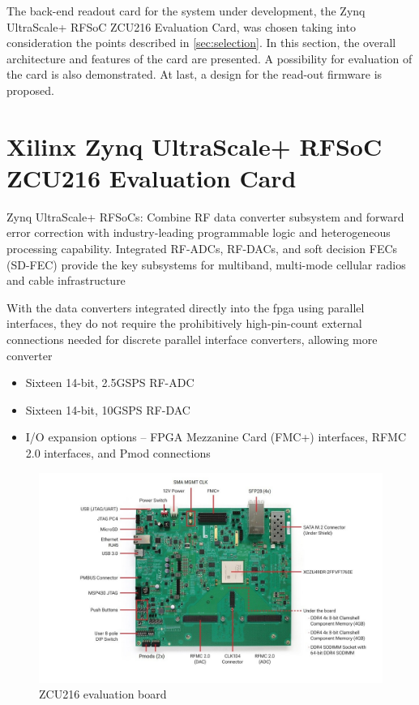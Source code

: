 The back-end readout card for the system under development, the Zynq UltraScale+ RFSoC ZCU216 Evaluation Card, was chosen taking into consideration the points described in \autoref{sec:selection}.
In this section, the overall architecture and features of the card are presented.
A possibility for evaluation of the card is also demonstrated.
At last, a design for the read-out firmware is proposed. 

\section{Xilinx Zynq UltraScale+ RFSoC ZCU216 Evaluation Card}
Zynq UltraScale+ RFSoCs: Combine RF data converter subsystem and forward error correction with industry-leading
programmable logic and heterogeneous processing capability. Integrated RF-ADCs, RF-DACs, and soft decision FECs (SD-FEC)
provide the key subsystems for multiband, multi-mode cellular radios and cable infrastructure


With the data converters integrated directly into the \gls{fpga} using parallel interfaces, they do not require the
prohibitively high-pin-count external connections needed for discrete parallel interface converters, allowing more converter

\begin{itemize}[noitemsep]
	\item Sixteen 14-bit, 2.5GSPS RF-ADC
	\item Sixteen 14-bit, 10GSPS RF-DAC
	\item I/O expansion options – FPGA Mezzanine Card (FMC+) interfaces, RFMC 2.0 interfaces, and Pmod connections
\end{itemize}
\begin{figure}[tbh]
	\centering
	\includegraphics[width = \textwidth]{chap/04-work/img/zcu216}
	\caption{ZCU216 evaluation board}
	\label{fig:zcu216}
\end{figure}

